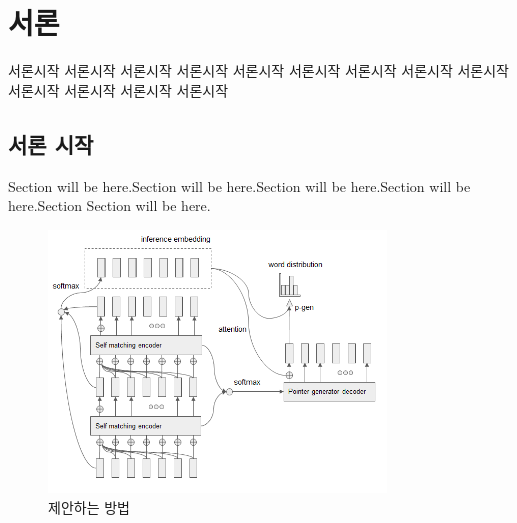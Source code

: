 \chapter{서론}

서론시작
서론시작
서론시작
서론시작
서론시작
서론시작
서론시작
서론시작
서론시작
서론시작
서론시작
서론시작
서론시작


\section{서론 시작}

Section will be here.Section will be here.Section will be here.Section will be here.Section 
Section will be here. \cite{Leo:1994ur}

\begin{figure}[h]
\centering
\includegraphics[width=0.8\textwidth]{figures/selfmatchingencoder.png}
\caption{제안하는 방법}
\end{figure}